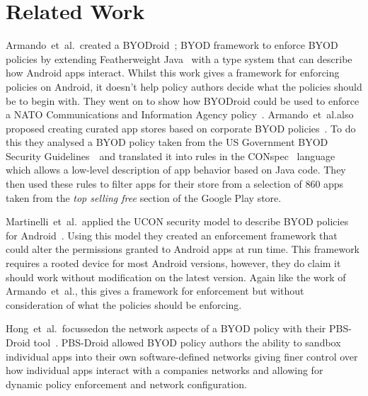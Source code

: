 \documentclass[a4paper]{article}
\makeatletter
\newcommand{\etal}[0]{et~al{.}\@}
\makeatother
\begin{document}
\section{Related Work}
\label{sec:related}

Armando~\etal~created a BYODroid~\cite{armando_bring_2013}; \ac{BYOD} framework
to enforce \ac{BYOD} policies by extending Featherweight
Java~\cite{igarashi_featherweight_2001} with a type system that can describe how
Android apps interact. Whilst this work gives a framework for enforcing policies
on Android, it doesn't help policy authors decide what the policies should be to
begin with. They went on to show how BYODroid could be used to enforce a {NATO}
Communications and Information Agency policy~\cite{armando_developing_2016}.
Armando~\etal also proposed creating curated app stores based on corporate BYOD
policies~\cite{armando_enabling_2014}. To do this they analysed a BYOD policy
taken from the US Government BYOD Security
Guidelines~\cite{digital_services_advisory_group_and_federal_chief_information_officers_council_bring_????}~and
translated it into rules in the CONspec~\cite{aktug_conspec_2008} language which
allows a low-level description of app behavior based on Java code. They then
used these rules to filter apps for their store from a selection of 860 apps
taken from the \emph{top selling free} section of the Google Play store.

Martinelli~\etal~applied the UCON security model to describe \ac{BYOD} policies
for Android~\cite{martinelli_enhancing_2016}. Using this model they created an
enforcement framework that could alter the permissions granted to Android apps
at run time. This framework requires a rooted device for most Android versions,
however, they do claim it should work without modification on the latest
version. Again like the work of Armando~\etal, this gives a framework for
enforcement but without consideration of what the policies should be enforcing.

Hong~\etal~focussedon the network aspects of a \ac{BYOD} policy with their
PBS-Droid tool~\cite{sungmin_hong_towards_2016}.  PBS-Droid allowed BYOD policy
authors the ability to sandbox individual apps into their own software-defined
networks giving finer control over how individual apps interact with a companies
networks and allowing for dynamic policy enforcement and network configuration.
\end{document}
